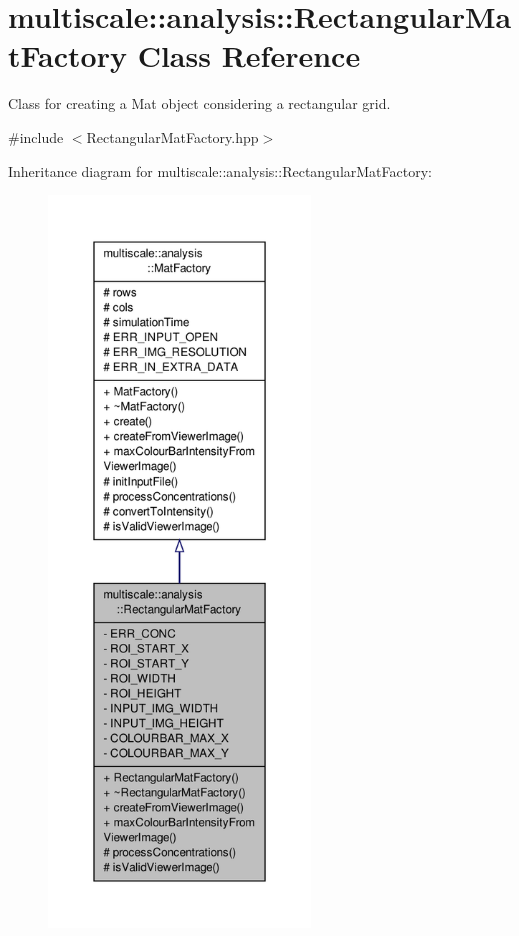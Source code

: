 \hypertarget{classmultiscale_1_1analysis_1_1RectangularMatFactory}{\section{multiscale\-:\-:analysis\-:\-:Rectangular\-Mat\-Factory Class Reference}
\label{classmultiscale_1_1analysis_1_1RectangularMatFactory}
}


Class for creating a Mat object considering a rectangular grid.  




{\ttfamily \#include $<$Rectangular\-Mat\-Factory.\-hpp$>$}



Inheritance diagram for multiscale\-:\-:analysis\-:\-:Rectangular\-Mat\-Factory\-:\nopagebreak
\begin{figure}[H]
\begin{center}
\leavevmode
\includegraphics[height=550pt]{classmultiscale_1_1analysis_1_1RectangularMatFactory__inherit__graph}
\end{center}
\end{figure}


